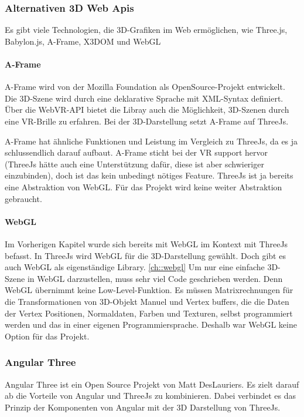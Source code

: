 \subsubsection{Alternativen 3D Web Apis}
Es gibt viele Technologien, die 3D-Grafiken im Web ermöglichen, wie Three.js, Babylon.js, A-Frame, X3DOM und WebGL

\paragraph{A-Frame}
A-Frame wird von der Mozilla Foundation als OpenSource-Projekt entwickelt. Die 3D-Szene wird durch eine deklarative Sprache mit XML-Syntax definiert. Über die WebVR-API bietet die Libray auch die Möglichkeit, 3D-Szenen durch eine VR-Brille zu erfahren. Bei der 3D-Darstellung setzt A-Frame auf ThreeJs. \cite[A-Frame Wikipedia]{a-frame-wiki}

A-Frame hat ähnliche Funktionen und Leistung im Vergleich zu ThreeJs, da es ja schlussendlich darauf aufbaut. A-Frame sticht bei der VR support hervor (ThreeJs hätte auch eine Unterstützung dafür, diese ist aber schwieriger einzubinden), doch ist das kein unbedingt nötiges Feature. ThreeJs ist ja bereits eine Abstraktion von WebGL. Für das Projekt wird keine weiter Abstraktion gebraucht.

\paragraph{WebGL}
Im Vorherigen Kapitel wurde sich bereits mit WebGL im Kontext mit ThreeJs befasst. In ThreeJs wird WebGL für die 3D-Darstellung gewählt. Doch gibt es auch WebGL als eigenständige Library. \ref{ch::webgl}
Um nur eine einfache 3D-Szene in WebGL darzustellen, muss sehr viel Code geschrieben werden. Denn WebGL übernimmt keine Low-Level-Funktion. Es müssen Matrixrechnungen für die Transformationen von 3D-Objekt Manuel und Vertex buffers, die die Daten der Vertex Positionen, Normaldaten, Farben und Texturen, selbst programmiert werden und das in einer eigenen Programmiersprache. Deshalb war WebGL keine Option für das Projekt.

\subsubsection{Angular Three}
\label{ch:Technologien:AngularThree}
Angular Three ist ein Open Source Projekt von Matt DesLauriers. Es zielt darauf ab die Vorteile von Angular und ThreeJs zu kombinieren. Dabei verbindet es das Prinzip der Komponenten von Angular mit der 3D Darstellung von ThreeJs. 

